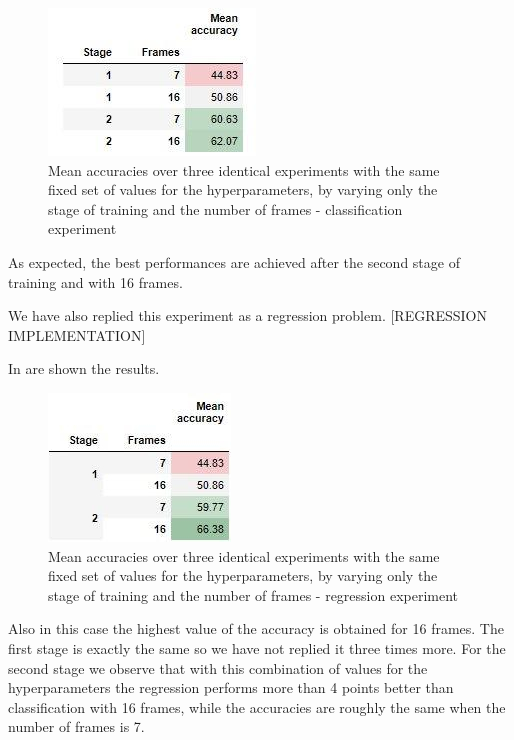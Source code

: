 \documentclass[10pt,twocolumn,hidelinks,letterpaper]{article}
\begin{document}
\begin{figure}[t]
	\centering
	\includegraphics[width=.6\linewidth]{images/step2.1_table.jpg}
	\caption{Mean accuracies over three identical experiments with the same fixed set of values for the hyperparameters, by varying only the stage of training and the number of frames - classification experiment}
	\label{ms_table}
\end{figure}

As expected, the best performances are achieved after the second stage of training and with 16 frames.

We have also replied this experiment as a regression problem.
[REGRESSION IMPLEMENTATION]

In  are shown the results.

\begin{figure}[t]
	\centering
	\includegraphics[width=.52\linewidth]{images/step2.3_table.jpg}
	\caption{Mean accuracies over three identical experiments with the same fixed set of values for the hyperparameters, by varying only the stage of training and the number of frames - regression experiment}
	\label{ms_reg_table}
\end{figure}

Also in this case the highest value of the accuracy is obtained for 16 frames. The first stage is exactly the same so we have not replied it three times more. For the second stage we observe that with this combination of values for the hyperparameters the regression performs more than 4 points better than classification with 16 frames, while the accuracies are roughly the same when the number of frames is 7.
\end{document}
